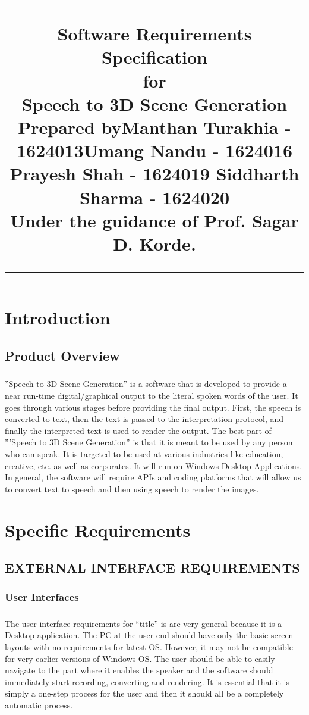 \documentclass[12pt,a4paper,final,oneside]{report}
\title{
\flushright
\rule{16cm}{5pt}\vskip0.5cm
\Huge{Software Requirements Specification}\\
\vspace{0.1cm}
for\\
\vspace{0.1cm}
Speech to 3D Scene Generation\\
\vspace{0.5cm}
Prepared by\linebreak Manthan Turakhia - 1624013\linebreak Umang Nandu - 1624016 \linebreak Prayesh Shah - 1624019 \linebreak Siddharth Sharma - 1624020\\
\vspace{0.5cm}
Under the guidance of \linebreak Prof. Sagar D. Korde.\\
\vfill
\rule{16cm}{5pt}	
}
\date{}
\begin{document}
\maketitle
\tableofcontents
\chapter{Introduction}
\section{Product Overview}
\paragraph{}''Speech to 3D Scene Generation'' is a software that is developed to provide a near run-time digital/graphical output to the literal spoken words of the user. It goes through various stages before providing the final output. First, the speech is converted to text, then the text is passed to the interpretation protocol, and finally the interpreted text is used to render the output.\linebreak
	The best part of '''Speech to 3D Scene Generation'' is that it is meant to be used by any person who can speak. It is targeted to be used at various industries like education, creative, etc. as well as corporates. It will run on Windows Desktop Applications. \linebreak
	In general, the software will require APIs and coding platforms that will allow us to convert text to speech and then using speech to render the images.

\chapter{Specific Requirements}
\section{EXTERNAL INTERFACE REQUIREMENTS}
\subsection{User Interfaces}
\paragraph{} The user interface requirements for “title” is are very general because it is a Desktop application. The PC at the user end should have only the basic screen layouts with no requirements for latest OS. However, it may not be compatible for very earlier versions of Windows OS.\linebreak
	The user should be able to easily navigate to the part where it enables the speaker and the software should immediately start recording, converting and rendering. It is essential that it is simply a one-step process for the user and then it should all be a completely automatic process.
\end{document}
